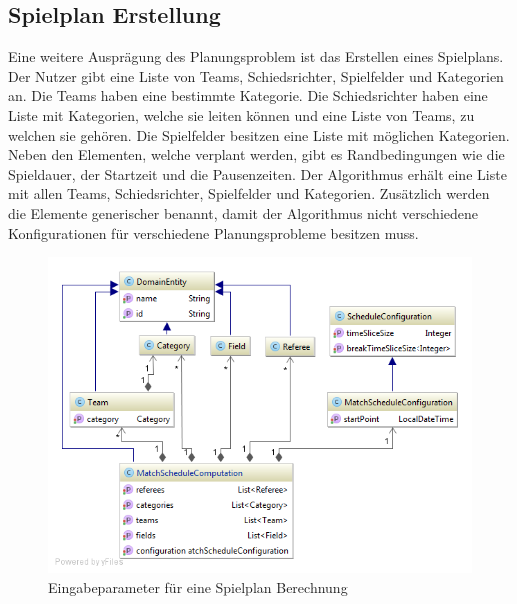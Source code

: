 %
%
%
%

\subsection{Spielplan Erstellung}
Eine weitere Ausprägung des Planungsproblem ist das Erstellen eines Spielplans. Der Nutzer gibt eine Liste von Teams, Schiedsrichter, Spielfelder und Kategorien an. Die Teams haben eine 
bestimmte Kategorie. Die Schiedsrichter haben eine Liste mit Kategorien, welche sie leiten können und eine Liste von Teams, zu welchen sie gehören. Die Spielfelder besitzen eine Liste mit 
möglichen Kategorien. Neben den Elementen, welche verplant werden, gibt es Randbedingungen wie die Spieldauer, der Startzeit und die Pausenzeiten. Der Algorithmus erhält eine 
Liste mit allen Teams, Schiedsrichter, Spielfelder und Kategorien. Zusätzlich werden die Elemente generischer benannt, damit der Algorithmus nicht verschiedene Konfigurationen für 
verschiedene Planungsprobleme besitzen muss.

\begin{figure}[h]
\centering
\includegraphics[scale=0.5]{images/probleme/matchSchedule.png}
\caption[Eingabeparameter für eine Spielplan Berechnung]{Eingabeparameter für eine Spielplan Berechnung \selfmade{}}
\label{fig:matchschedule_input}
\end{figure}

